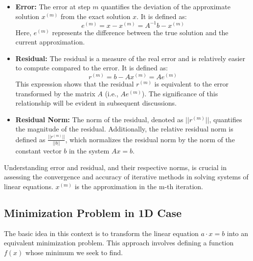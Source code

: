 \documentclass[unicode,11pt,a4paper,oneside,numbers=endperiod,openany]{scrartcl}
\begin{document}
\begin{itemize}
    \item \textbf{Error:} The error at step \( m \) quantifies the deviation of the approximate solution \( x^{(m)} \) from the exact solution \( x \). It is defined as:
    \[
    e^{(m)} = x - x^{(m)} = A^{-1}b - x^{(m)}
    \]
    Here, \( e^(m )\) represents the difference between the true solution and the current approximation.

    \item \textbf{Residual:} The residual is a measure of the real error and is relatively easier to compute compared to the error. It is defined as:
    \[
    r^{(m)} = b - Ax^{(m)} = Ae^{(m)}
    \]
    This expression shows that the residual \( r^{(m)} \) is equivalent to the error transformed by the matrix \( A \) (i.e., \( Ae^{(m)} \)). The significance of this relationship will be evident in subsequent discussions.

    \item \textbf{Residual Norm:} The norm of the residual, denoted as \( ||r^{(m)}|| \), quantifies the magnitude of the residual. Additionally, the relative residual norm is defined as \( \frac{||r^{(m)}||}{||b||} \), which normalizes the residual norm by the norm of the constant vector \( b \) in the system \( Ax = b \).
\end{itemize}

Understanding error and residual, and their respective norms, is crucial in assessing the convergence and accuracy of iterative methods in solving systems of linear equations.
\newline
$x^(m)$ is the approximation in the m-th iteration.

\subsection{Minimization Problem in 1D Case}

The basic idea in this context is to transform the linear equation \( a \cdot x = b \) into an equivalent minimization problem. This approach involves defining a function \( f(x) \) whose minimum we seek to find.
\end{document}
